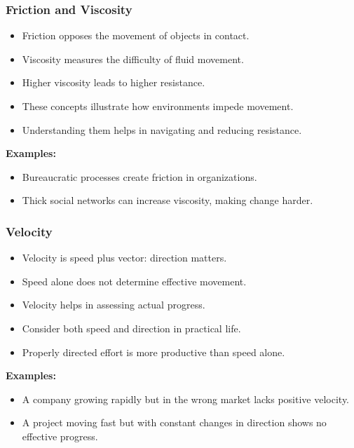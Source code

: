 \begin{frame}[fragile]\frametitle{Friction and Viscosity}
\begin{itemize}
    \item Friction opposes the movement of objects in contact.
    \item Viscosity measures the difficulty of fluid movement.
    \item Higher viscosity leads to higher resistance.
    \item These concepts illustrate how environments impede movement.
    \item Understanding them helps in navigating and reducing resistance.
\end{itemize}
\textbf{Examples:}
\begin{itemize}
    \item Bureaucratic processes create friction in organizations.
    \item Thick social networks can increase viscosity, making change harder.
\end{itemize}
\end{frame}

\begin{frame}[fragile]\frametitle{Velocity}
\begin{itemize}
    \item Velocity is speed plus vector: direction matters.
    \item Speed alone does not determine effective movement.
    \item Velocity helps in assessing actual progress.
    \item Consider both speed and direction in practical life.
    \item Properly directed effort is more productive than speed alone.
\end{itemize}
\textbf{Examples:}
\begin{itemize}
    \item A company growing rapidly but in the wrong market lacks positive velocity.
    \item A project moving fast but with constant changes in direction shows no effective progress.
\end{itemize}
\end{frame}

